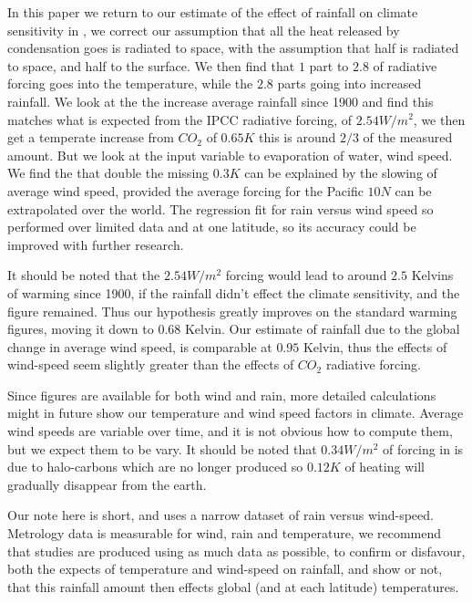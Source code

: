 \documentclass{book}
\begin{document}
   In this paper we return to our estimate of the effect of rainfall on climate sensitivity in \cite{Adams1}, we correct our assumption that all the heat released by condensation goes is radiated to space, with the
   assumption that half is radiated to space, and half to the surface. We then find that $1$ part to $2.8$ of radiative forcing goes into the temperature, while the $2.8$ parts going into increased rainfall. We look at the the increase average rainfall since 1900 and find this matches what is expected from the IPCC radiative forcing, \cite{Radiative} of $2.54 W/m^2$, we then get a temperate increase from $CO_2$ of $0.65K$ this is around $2/3$ of the measured amount. But we look at the input variable to evaporation of water, wind speed. We find the that double the missing $0.3K$ can be explained by the slowing of average wind speed, provided the average forcing for the Pacific $10N$ can be extrapolated over the world. The regression fit for rain versus wind speed so performed over limited data and at one latitude, so its accuracy could be improved with further research.
   
    It should be noted that the $2.54 W/m^2$ forcing \cite{Radiative} would lead to around $2.5$ Kelvins of warming since 1900, if the rainfall didn't effect the climate sensitivity, and the \cite{wikisense} figure remained. Thus our hypothesis greatly improves on the standard warming figures, moving it down to $0.68$ Kelvin. Our estimate of rainfall due to the global change in average wind speed, is comparable at $0.95$ Kelvin,
     thus the effects of wind-speed seem slightly greater than the effects of $CO_2$ radiative forcing.
    
     Since figures are available for both wind and rain, more detailed calculations might in future show our temperature and wind speed factors in climate. Average wind speeds are variable over time, and it is not obvious how to compute them, but we expect them to be vary. It should be noted that $0.34 W/m^2$ of forcing in \cite{Radiative} is due to halo-carbons which are no longer produced so $0.12K$ of heating will gradually disappear from the earth.
           		
   Our note here is short, and uses a narrow dataset of rain versus wind-speed. Metrology data is measurable for wind, rain and temperature, we recommend that studies are produced using as much data as possible, to
   confirm or disfavour, both the expects of temperature and wind-speed on rainfall, and show or not, that this rainfall amount then effects global (and at each latitude) temperatures.
   
\end{document}
